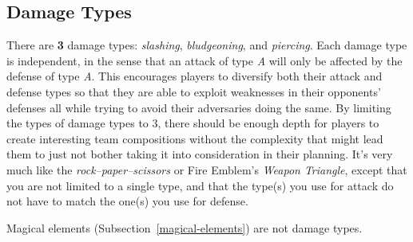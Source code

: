 \subsection{Damage Types}
\label{damage-types}
There are \textbf{3} damage types: \textit{slashing}, \textit{bludgeoning}, and
\textit{piercing}. Each damage type is
independent, in the sense that an attack of type \textit{A} will only be
affected by the defense of type \textit{A}. This encourages players to
diversify both their attack and defense types so that they are able to exploit
weaknesses in their opponents' defenses all while trying to avoid their
adversaries doing the same. By limiting the types of damage types to 3, there
should be enough depth for players to create interesting team compositions
without the complexity that might lead them to just not bother taking it into
consideration in their planning. It's very much like the
\textit{rock–paper–scissors} or Fire Emblem's \textit{Weapon Triangle}, except
that you are not limited to a single type, and that the type(s) you use for
attack do not have to match the one(s) you use for defense.

Magical elements (Subsection~\ref{magical-elements}) are not damage types.
